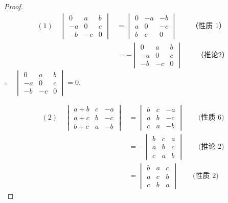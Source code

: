 \begin{proof}
\[\begin{split}
  (1)\quad \begin{vmatrix} 0& a& b\\ - a& 0& c\\ - b& - c& 0\end{vmatrix} &= \begin{vmatrix} 0& - a& - b\\ a& 0& - c\\ b& c& 0\end{vmatrix}\qquad \text{（性质 1）}\\
  &=-\begin{vmatrix}0&a&b\\-a&0&c\\-b&-c&0\end{vmatrix}\qquad \text{（推论2）}
\end{split} \]
$\therefore\quad \begin{vmatrix} 0& a& b\\ - a& 0& c\\ - b& - c& 0\end{vmatrix}=0.$

\[\begin{split}
  (2)\quad \begin{vmatrix}a+b&c&-a\\a+c&b&-c\\b+c&a&-b\end{vmatrix}&=\begin{vmatrix}b&c&-a\\a&b&-c\\c&a&-b\end{vmatrix}\qquad \text{(性质 6)}\\
  &=- \begin{vmatrix} b& c& a\\ a& b& c\\ c& a& b\end{vmatrix}\qquad \text{(推论 2)} \\
  &= \begin{vmatrix} b& a& c\\ a& c& b\\ c& b& a\end{vmatrix}\qquad \text{(性质 2)}
\end{split}\]
\end{proof}

